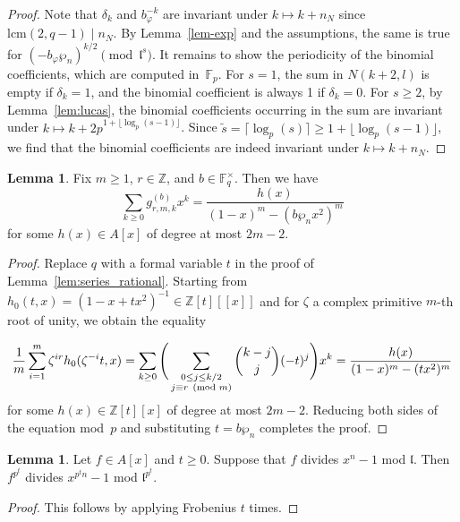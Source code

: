 \documentclass[10pt]{article}
\theoremstyle{definition}
\newtheorem{lemma}[theorem]{Lemma}
\let\phi\varphi
\renewcommand{\:}{\colon}
\newcommand{\bF}{\mathbb{F}}
\renewcommand{\l}{\mathfrak{l}}
\begin{document}
\begin{proof}
    Note that $\delta_k$ and $b_{\phi}^{-k}$ are invariant under $k \mapsto k + n_N$ since $\text{lcm}(2,q-1) \mid n_N$. By Lemma~\ref{lem-exp} and the assumptions,
    the same is true for $(-b_{\phi}\wp_n)^{k/2} \pmod{\l^s}$. It remains to show the periodicity of the binomial coefficients, which are computed in~$\bF_p$. For $s=1$, the sum in $N(k+2,l)$ is empty if $\delta_k = 1$, and the binomial coefficient is always 1 if $\delta_k = 0$.
    For $s \geq 2$, by Lemma~\ref{lem:lucas}, 
    the binomial coefficients occurring in the sum are invariant under $k \mapsto k + 2p^{1 + \lfloor \log_p( s-1 ) \rfloor}$. Since
    $\tilde{s} = \lceil \log_p(s) \rceil \geq 1 + \lfloor \log_p( s-1 ) \rfloor$, we find that the binomial coefficients are indeed invariant under $k \mapsto k + n_N$.
\end{proof}

\begin{lemma}\label{lem:series_rational_ff}
    Fix $m \geq 1$, $r \in \mathbb Z$, and $b \in \mathbb F_q^\times$. Then we have 
    \[
    \sum_{k \geq 0} g^{(b)}_{r,m,k} x^k = \frac{h(x)}{(1-x)^m - (b\wp_n x^2)^m}
    \]
    for some $h(x) \in A[x]$ of degree at most $2m-2$.
\end{lemma}

\begin{proof}
    Replace $q$ with a formal variable $t$ in the proof of Lemma~\ref{lem:series_rational}. Starting from $h_0(t,x) = (1-x+tx^2)^{-1} \in \mathbb Z[t][\![x]\!]$ and for $\zeta$ a complex primitive $m$-th root of unity, we obtain the equality
    
    \[
    \frac{1}{m} \sum_{i=1}^m \zeta^{ir}h_0(\zeta^{-i}t,x) = \sum_{k \geq 0} \Bigg{(} \sum_{\substack{0 \leq j \leq k/2 \\ j \equiv r \pmod{m}}} \binom{k-j}{j} (-t)^j \Bigg{)}x^k = \frac{h(x)}{(1-x)^m - (tx^2)^m} 
    \]
    for some $h(x) \in \mathbb Z[t][x]$ of degree at most $2m-2$. Reducing both sides of the equation mod~$p$ and substituting $t = b\wp_n$ completes the proof.
\end{proof}

\begin{lemma}\label{lem:div_upgrade_ff}
    Let $f \in A[x]$ and $t \geq 0$. Suppose that $f$ divides $x^n - 1$ mod $\l$. Then $f^{p^t}$ divides $x^{p^tn}-1$ mod $\l^{p^t}$.
\end{lemma}

\begin{proof}
    This follows by applying Frobenius $t$ times.
\end{proof}
\end{document}
